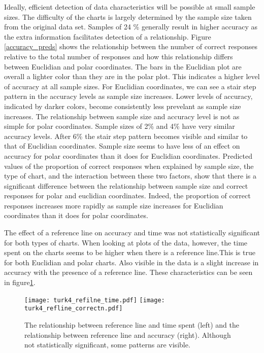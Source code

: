 Ideally, efficient detection of data characteristics will be possible at small sample sizes. The difficulty of the charts is largely determined by the sample size taken from the original data set. Samples of 24 \% generally result in higher accuracy as the extra information facilitates detection of a relationship. Figure \ref{accuracy_preds} shows the relationship between the number of correct responses relative to the total number of responses and how this relationship differs between Euclidian and polar coordinates. The bars in the Euclidian plot are overall a lighter color than they are in the polar plot. This indicates a higher level of accuracy at all sample sizes. For Euclidian coordinates, we can see a stair step pattern in the accuracy levels as sample size increases. Lower levels of accuracy, indicated by darker colors, become consistently less prevelant as sample size increases. The relationship between sample size and accuracy level is not as simple for polar coordinates. Sample sizes of 2\% and 4\% have very similar accuracy levels. After 6\% the stair step pattern becomes visible and similar to that of Euclidian coordinates. Sample size seems to have less of an effect on accuracy for polar coordinates than it does for Euclidian coordinates. Predicted values of the proportion of correct responses when explained by sample size, the type of chart, and the interaction between these two factors, show that there is a significant difference between the relationship between sample size and correct responses for polar and euclidian coordinates. Indeed, the proportion of correct responses increases more rapidly as sample size increases for Euclidian coordinates than it does for polar coordinates. 

The effect of a reference line on accuracy and time was not statistically significant for both types of charts. When looking at plots of the data, however, the time spent on the charts seems to be higher when there is a reference line.This is true for both Euclidian and polar charts. Also visible in the data is a slight increase in accuracy with the presence of a reference line. These characteristics can be seen in figure\ref{reflines}.  

\begin{figure}[htbp] %
   \centering
   \texttt{[image: turk4\_refilne\_time.pdf]}  
   \texttt{[image: turk4\_refline\_correctn.pdf]}  
   \caption{The relationship between reference line and time spent (left) and the relationship between reference line and accuracy (right). Although not statistically significant, some patterns are visible.}
   \label{reflines}
\end{figure}







